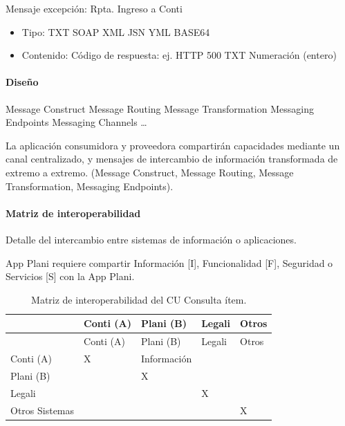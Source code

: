 \documentclass[
  paper=a4,
  ,captions=tableheading
]{scrartcl}
\providecommand{\tightlist}{%
  \setlength{\itemsep}{0pt}\setlength{\parskip}{0pt}}
\begin{document}
Mensaje excepción: Rpta. Ingreso a Conti

\begin{itemize}
\tightlist
\item
  Tipo: TXT \textbar{} SOAP \textbar{} XML \textbar{} JSN \textbar{} YML
  \textbar{} BASE64
\item
  Contenido: Código de respuesta: ej. HTTP 500 \textbar{} TXT \textbar{}
  Numeración (entero)
\end{itemize}

\paragraph{Diseño}\label{sec:diseuxf1o-1}

Message Construct \textbar{} Message Routing \textbar{} Message
Transformation \textbar{} Messaging Endpoints \textbar{} Messaging
Channels \textbar{} \ldots{}

La aplicación consumidora y proveedora compartirán capacidades mediante
un canal centralizado, y mensajes de intercambio de información
transformada de extremo a extremo. (Message Construct, Message Routing,
Message Transformation, Messaging Endpoints).

\paragraph{Matriz de
interoperabilidad}\label{sec:matriz-de-interoperabilidad-1}

Detalle del intercambio entre sistemas de información o aplicaciones.

App Plani requiere compartir Información {[}I{]}, Funcionalidad {[}F{]},
Seguridad o Servicios {[}S{]} con la App Plani.

\begin{longtable}[]{@{}lllll@{}}
\caption{Matriz de interoperabilidad del CU Consulta
ítem.}\tabularnewline
\toprule\noalign{}
& Conti (A) & Plani (B) & Legali & Otros \\
\midrule\noalign{}
\endfirsthead
\toprule\noalign{}
& Conti (A) & Plani (B) & Legali & Otros \\
\midrule\noalign{}
\endhead
\bottomrule\noalign{}
\endlastfoot
Conti (A) & X & Información & & \\
Plani (B) & & X & & \\
Legali & & & X & \\
Otros Sistemas & & & & X \\
\end{longtable}
\end{document}
